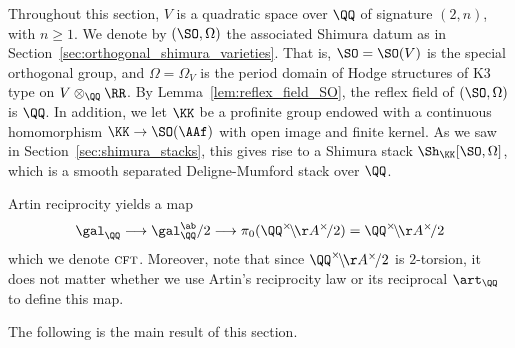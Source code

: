 Throughout this section, $V$ is a quadratic space over $\QQ$ of signature $(2,n)$, with $n \geq 1$. We denote by $(\SO,\Omega)$ the associated Shimura datum as in Section~\ref{sec:orthogonal_shimura_varieties}. That is, $\SO = \SO(V)$ is the special orthogonal group, and $\Omega = \Omega_V$ is the period domain of Hodge structures of K3 type on $V \otimes_{\QQ} \RR$. By Lemma~\ref{lem:reflex_field_SO}, the reflex field of $(\SO,\Omega)$ is $\QQ$. In addition, we let $\KK$ be a profinite group endowed with a continuous homomorphism $\KK \rightarrow \SO(\AAf)$ with open image and finite kernel. As we saw in Section~\ref{sec:shimura_stacks}, this gives rise to a Shimura stack $\Sh_{\KK}[\SO,\Omega]$, which is a smooth separated Deligne-Mumford stack over $\QQ$.

\begin{remark}
Artin reciprocity yields a map
$$
    \gal_{\QQ} \longrightarrow \gal_{\QQ}^{\ab}/2 \longrightarrow \pi_0(\QQ^{\times}\!\backslash\!\AA^{\times}\!/2) = \QQ^{\times}\!\backslash\!\AA^{\times}\!/2
$$
    which we denote $\textsc{cft}$. Moreover, note that since $\QQ^{\times}\!\backslash\!\AA^{\times}\!/2$ is $2$-torsion, it does not matter whether we use Artin's reciprocity law or its reciprocal $\art_{\QQ}$ to define this map.
\end{remark}

The following is the main result of this section.


